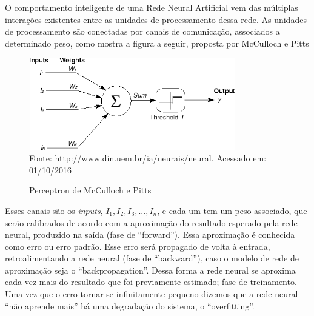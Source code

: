 O comportamento inteligente de uma Rede Neural Artificial vem das múltiplas interações existentes entre as unidades de processamento dessa rede. 
As unidades de processamento são conectadas por canais de comunicação, associados a determinado peso, como mostra a figura a seguir, proposta por McCulloch e Pitts \cite{mcculloch1943logical}

\begin{figure}[!ht]
\centering
\caption{Perceptron de McCulloch e Pitts}
\vspace{1mm}
\includegraphics[width=90mm, height=40mm]{Figuras/Neural/Perceptron.png}\\
\tiny Fonte: http://www.din.uem.br/ia/neurais/neural. Acessado em: 01/10/2016
\end{figure}

Esses canais são os  \textit{inputs}, $ I_{1}, I_{2}, I_{3},...,I_{n}$, e cada um tem um peso associado, que serão calibrados de acordo 
com a aproximação do resultado esperado pela rede neural, produzido na saída (fase de ``forward''). 
Essa aproximação é conhecida como erro ou erro padrão. Esse erro será propagado de volta à entrada, retroalimentando a rede neural (fase de ``backward''), 
caso o modelo de rede de aproximação seja o ``backpropagation''. Dessa forma a rede neural se aproxima cada vez mais do resultado que foi previamente estimado; fase de treinamento.
Uma vez que o erro tornar-se infinitamente pequeno dizemos que a rede neural ``não aprende mais'' há uma degradação do sistema, o ``overfitting''.


